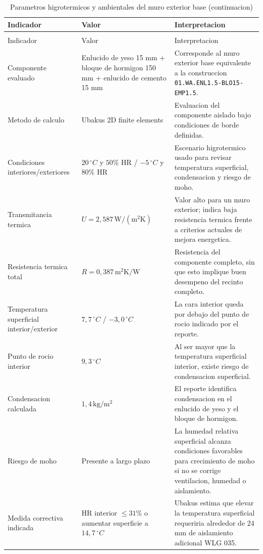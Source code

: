 {\fontsize{9}{11}\selectfont
\begin{longtable}{p{4.4cm}p{2.8cm}p{6.1cm}}
  \caption{Parametros higrotermicos y ambientales del muro exterior base} \\
  \toprule
  Indicador & Valor & Interpretacion \\
  \midrule
  \endfirsthead
  \caption[]{Parametros higrotermicos y ambientales del muro exterior base (continuacion)} \\
  \toprule
  Indicador & Valor & Interpretacion \\
  \midrule
  \endhead
  \bottomrule
  \endfoot
  Componente evaluado & Enlucido de yeso 15 mm + bloque de hormigon 150 mm + enlucido de cemento 15 mm & Corresponde al muro exterior base equivalente a la construccion \texttt{01.WA.ENL1.5-BLO15-EMP1.5}. \\
  Metodo de calculo & Ubakus 2D finite elements & Evaluacion del componente aislado bajo condiciones de borde definidas. \\
  Condiciones interiores/exteriores & $20\,^\circ C$ y $50\%$ HR / $-5\,^\circ C$ y $80\%$ HR & Escenario higrotermico usado para revisar temperatura superficial, condensacion y riesgo de moho. \\
  Transmitancia termica & $U=2,587\,\mathrm{W/(m^2K)}$ & Valor alto para un muro exterior; indica baja resistencia termica frente a criterios actuales de mejora energetica. \\
  Resistencia termica total & $R=0,387\,\mathrm{m^2K/W}$ & Resistencia del componente completo, sin que esto implique buen desempeno del recinto completo. \\
  Temperatura superficial interior/exterior & $7,7\,^\circ C$ / $-3,0\,^\circ C$ & La cara interior queda por debajo del punto de rocio indicado por el reporte. \\
  Punto de rocio interior & $9,3\,^\circ C$ & Al ser mayor que la temperatura superficial interior, existe riesgo de condensacion superficial. \\
  Condensacion calculada & $1,4\,\mathrm{kg/m^2}$ & El reporte identifica condensacion en el enlucido de yeso y el bloque de hormigon. \\
  Riesgo de moho & Presente a largo plazo & La humedad relativa superficial alcanza condiciones favorables para crecimiento de moho si no se corrige ventilacion, humedad o aislamiento. \\
  Medida correctiva indicada & HR interior $\leq31\%$ o aumentar superficie a $14,7\,^\circ C$ & Ubakus estima que elevar la temperatura superficial requeriria alrededor de $24$ mm de aislamiento adicional WLG 035. \\

\end{longtable}}
